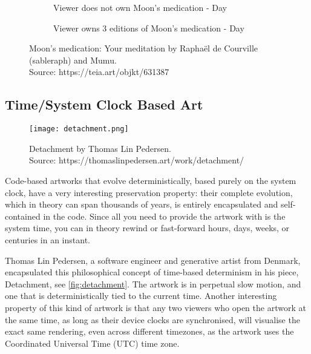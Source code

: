 
\begin{figure}[H]
  \centering
  \captionsetup{justification=centering}
  \begin{subfigure}[b]{0.45\textwidth}
    \centering
    \caption{Viewer does not own Moon's medication - Day}
    \label{fig:adam-no-own}
  \end{subfigure}
  \hfill
  \begin{subfigure}[b]{0.45\textwidth}
    \centering
    \caption{Viewer owns 3 editions of Moon's medication - Day}
    \label{fig:adam-own}
  \end{subfigure}
  \caption[Moon's medication : Your meditation]{Moon's medication: Your meditation by Raphaël de Courville (sableraph) and Mumu. \\ Source: https://teia.art/objkt/631387}
  \label{fig:moon-med}
\end{figure}


\subsection{Time/System Clock Based Art}

\begin{figure}[h]
    \centering
    \captionsetup{justification=centering}
    \texttt{[image: detachment.png]}
    \captionsetup{justification=centering}
    \caption[Detachment by Thomas Lin Pedersen]{Detachment by Thomas Lin Pedersen. \\ Source: https://thomaslinpedersen.art/work/detachment/}
    \label{fig:detachment}
\end{figure}

Code-based artworks that evolve deterministically, based purely on the system clock, have a very interesting preservation property: their complete evolution, which in theory can span thousands of years, is entirely encapsulated and self-contained in the code. Since all you need to provide the artwork with is the system time, you can in theory rewind or fast-forward hours, days, weeks, or centuries in an instant.

Thomas Lin Pedersen\footnotemark[9], a software engineer and generative artist from Denmark, encapsulated this philosophical concept of time-based determinism in his piece, Detachment, see \autoref{fig:detachment}. The artwork is in perpetual slow motion, and one that is deterministically tied to the current time.
Another interesting property of this kind of artwork is that any two viewers who open the artwork at the same time, as long as their device clocks are synchronised, will visualise the exact same rendering, even across different timezones, as the artwork uses the Coordinated Universal Time (UTC) time zone.

